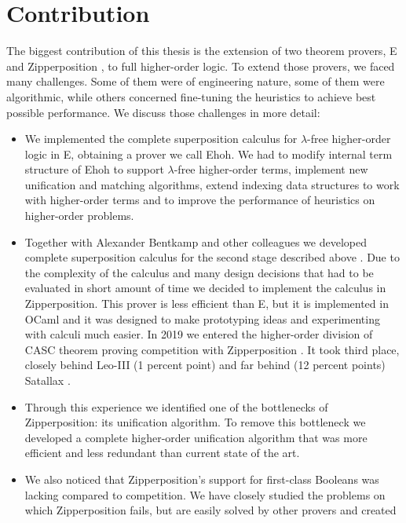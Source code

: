\section{Contribution}

The biggest contribution of this thesis is the extension of two theorem provers,
E and Zipperposition \cite{sc-15-simon-phd}, to full higher-order logic. To
extend those provers, we faced many challenges. Some of them were of engineering
nature, some of them were algorithmic, while others concerned fine-tuning the
heuristics to achieve best possible performance. We discuss those challenges in more detail:
\begin{itemize}
  \item We implemented the complete superposition calculus for $\lambda$-free
  higher-order logic \cite{bbcw-21-lfho} in E, obtaining a prover we call Ehoh.
  We had to modify internal term structure of Ehoh to support $\lambda$-free
  higher-order terms, implement new unification and matching algorithms, extend
  indexing data structures to work with higher-order terms and to improve the
  performance of heuristics on higher-order problems.
  \item Together with Alexander Bentkamp and other colleagues we developed
  complete superposition calculus for the second stage described above
  \cite{bbtvw-21-sup-lam}. Due to the complexity of the calculus and many design
  decisions that had to be evaluated in short amount of time we decided to
  implement the calculus in Zipperposition. This prover is less efficient than
  E, but it is implemented in OCaml and it was designed to make prototyping
  ideas and experimenting with calculi much easier. In 2019 we entered the
  higher-order division of CASC theorem proving competition with Zipperposition
  \cite{gs-19-casc27}. It took third place, closely behind Leo-III (1 percent
  point) \cite{sb-21-leo3} and far behind (12 percent points) Satallax
  \cite{cb-12-satallax}.
  \item Through this experience we identified one of the bottlenecks of
  Zipperposition: its unification algorithm. To remove this bottleneck we
  developed a complete higher-order unification algorithm that was more
  efficient and less redundant than current state of the art. 
  \item We also noticed that Zipperposition's support for first-class Booleans
  was lacking compared to competition. We have closely studied the problems on
  which Zipperposition fails, but are easily solved by other provers and created

\end{itemize}
